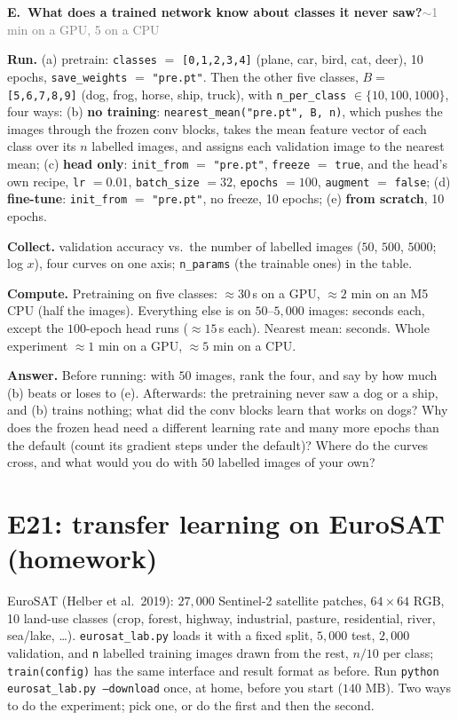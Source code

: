 \documentclass[11pt]{article}
\newcommand{\code}[1]{\texttt{#1}}
\newcounter{exp}
\newenvironment{experiment}[2]{\refstepcounter{exp}\par\medskip
  \textbf{\textcolor{aiblue}{E\theexp.\ #1}}\hfill{\small\textcolor{gray}{#2}}\par}{\par}
\newcommand{\run}[1]{\textbf{Run.} #1\par}
\newcommand{\collect}[1]{\textbf{Collect.} #1\par}
\newcommand{\answer}[1]{\textbf{Answer.} #1\par}
\newcommand{\heavy}[1]{\textcolor{gray!70!black}{\textbf{Compute.} #1}\par}
\begin{document}
\begin{experiment}{What does a trained network know about classes it never saw?}{$\sim$1 min on a GPU, 5 on a CPU}
\run{(a) pretrain: \code{classes} $=$ \code{[0,1,2,3,4]} (plane, car, bird, cat, deer), 10 epochs, \code{save\_weights} $=$ \code{"pre.pt"}. Then the other five classes, $B=$ \code{[5,6,7,8,9]} (dog, frog, horse, ship, truck), with \code{n\_per\_class} $\in\{10, 100, 1000\}$, four ways: (b) \textbf{no training}: \code{nearest\_mean("pre.pt", B, n)}, which pushes the images through the frozen conv blocks, takes the mean feature vector of each class over its $n$ labelled images, and assigns each validation image to the nearest mean; (c) \textbf{head only}: \code{init\_from} $=$ \code{"pre.pt"}, \code{freeze} $=$ \code{true}, and the head's own recipe, \code{lr} $=0.01$, \code{batch\_size} $=32$, \code{epochs} $=100$, \code{augment} $=$ \code{false}; (d) \textbf{fine-tune}: \code{init\_from} $=$ \code{"pre.pt"}, no freeze, 10 epochs; (e) \textbf{from scratch}, 10 epochs.}
\collect{validation accuracy vs.\ the number of labelled images ($50$, $500$, $5000$; log $x$), four curves on one axis; \code{n\_params} (the trainable ones) in the table.}
\heavy{Pretraining on five classes: $\approx30$\,s on a GPU, $\approx2$ min on an M5 CPU (half the images). Everything else is on $50$--$5{,}000$ images: seconds each, except the $100$-epoch head runs ($\approx15$\,s each). Nearest mean: seconds. Whole experiment $\approx1$ min on a GPU, $\approx5$ min on a CPU.}
\answer{Before running: with $50$ images, rank the four, and say by how much (b) beats or loses to (e). Afterwards: the pretraining never saw a dog or a ship, and (b) trains nothing; what did the conv blocks learn that works on dogs? Why does the frozen head need a different learning rate and many more epochs than the default (count its gradient steps under the default)? Where do the curves cross, and what would you do with $50$ labelled images of your own?}
\end{experiment}

\section*{E21: transfer learning on EuroSAT (homework)}
EuroSAT (Helber et al.\ 2019): $27{,}000$ Sentinel-2 satellite patches, $64\times64$ RGB, 10 land-use classes (crop, forest, highway, industrial, pasture, residential, river, sea/lake, \dots). \code{eurosat\_lab.py} loads it with a fixed split, $5{,}000$ test, $2{,}000$ validation, and \code{n} labelled training images drawn from the rest, $n/10$ per class; \code{train(config)} has the same interface and result format as before. Run \code{python eurosat\_lab.py --download} once, at home, before you start ($140$ MB). Two ways to do the experiment; pick one, or do the first and then the second.
\end{document}
